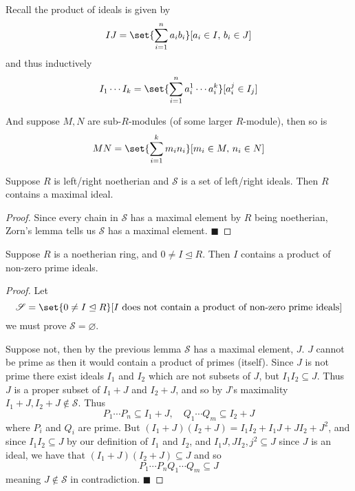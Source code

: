 \documentclass[10pt]{article}
\let\ideal=\trianglelefteq
\def\qed{%
    \ifmmode%
        \eqno\blacksquare%
    \else%
        \hskip1cm\allowbreak\hbox{}\nobreak\hfill$\blacksquare$%
    \fi%
}
\def\sS{\mathscr S}
\begin{document}


\bigskip

Recall the product of ideals is given by
\[ IJ = \set{\sum_{i=1}^n a_ib_i}[a_i\in I,\,b_i\in J] \]
and thus inductively
\[ I_1\cdots I_k = \set{\sum_{i=1}^n a_i^1\cdots a_i^k}[a_i^j\in I_j] \]

And suppose $M,N$ are sub-$R$-modules (of some larger $R$-module), then so is
\[ MN = \set{\sum_{i=1}^k m_in_i}[m_i\in M,\,n_i\in N] \]

\begin{lemm*}

    Suppose $R$ is left/right noetherian and $\sS$ is a set of left/right ideals.
    Then $R$ contains a maximal ideal.

\end{lemm*}

\begin{proof}

    Since every chain in $\sS$ has a maximal element by $R$ being noetherian, Zorn's lemma tells us $\sS$ has a maximal element.
    \qed

\end{proof}

\begin{lemm*}

    Suppose $R$ is a noetherian ring, and $0\neq I\ideal R$.
    Then $I$ contains a product of non-zero prime ideals.

\end{lemm*}

\begin{proof}

    Let
    \[ \sS = \set{0\neq I\ideal R}[I\text{ does not contain a product of non-zero prime ideals}] \]
    we must prove $\sS=\varnothing$.

    Suppose not, then by the previous lemma $\sS$ has a maximal element, $J$.
    $J$ cannot be prime as then it would contain a product of primes (itself).
    Since $J$ is not prime there exist ideals $I_1$ and $I_2$ which are not subsets of $J$, but $I_1I_2\subseteq J$.
    Thus $J$ is a proper subset of $I_1+J$ and $I_2+J$, and so by $J$'s maximality $I_1+J,I_2+J\notin\sS$.
    Thus
    \[ P_1\cdots P_n\subseteq I_1+J,\quad Q_1\cdots Q_m\subseteq I_2+J \]
    where $P_i$ and $Q_i$ are prime.
    But $(I_1+J)(I_2+J)=I_1I_2+I_1J+JI_2+J^2$, and since $I_1I_2\subseteq J$ by our definition of $I_1$ and $I_2$, and $I_1J,JI_2,j^2\subseteq J$ since $J$ is an ideal, we have that
    $(I_1+J)(I_2+J)\subseteq J$ and so
    \[ P_1\cdots P_nQ_1\cdots Q_m\subseteq J \]
    meaning $J\notin\sS$ in contradiction.
    \qed

\end{proof}
\end{document}
